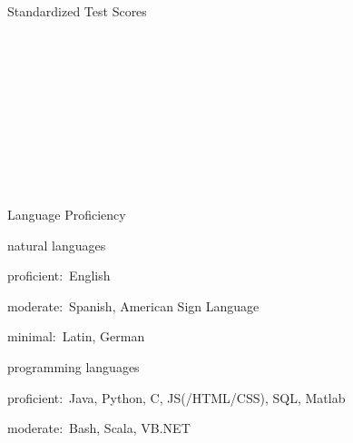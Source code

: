 \documentclass{resume}
\newcommand{\AP}[0]{\DepartmentTitle{AP Coursework}{}}
\begin{document}
\begin{rSection}{Standardized Test Scores}
        \BeginDeptEvents
        \\
        \\
        \\
        \\
        \\
        \\
        \\
        \\
        \\
        \EndDeptEvents

      \AP

        \BeginDeptEvents
        \\
        \EndDeptEvents

  \end{rSection}





  \newpage

  \begin{rSection}{Language Proficiency}

  \begin{rSubSection}{\normalfont natural languages}{}{}{}
  \item proficient:~English
  \item moderate:~Spanish, American Sign Language
  \item minimal:~Latin, German
  \end{rSubSection}

  \begin{rSubSection}{\normalfont programming languages}{}{}{}
  \item proficient:~Java, Python, C, JS(/HTML/CSS), SQL, Matlab
  \item moderate:~Bash, Scala, VB.NET
  \end{rSubSection}

  \end{rSection}
\end{document}
